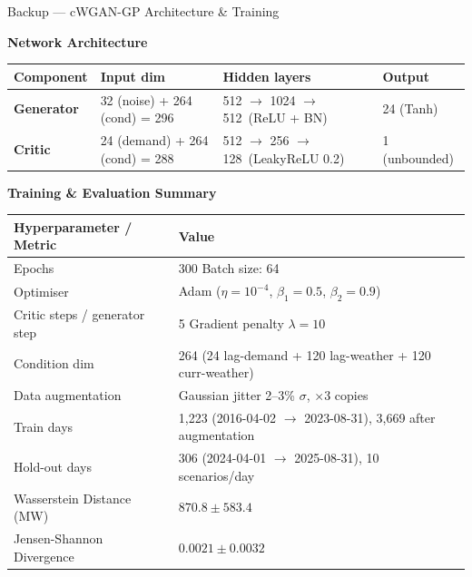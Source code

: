 \documentclass[aspectratio=169, 10pt]{beamer}
\begin{document}
\begin{frame}{Backup — cWGAN-GP Architecture \& Training}

\centering
\textbf{Network Architecture}

\vspace{0.4em}
\begin{tabular}{@{}llll@{}}
\toprule
Component & Input dim & Hidden layers & Output \\
\midrule
\textbf{Generator} & 32 (noise) + 264 (cond) = 296 & 512 $\to$ 1024 $\to$ 512\ (ReLU + BN) & 24 (Tanh) \\
\textbf{Critic}    & 24 (demand) + 264 (cond) = 288 & 512 $\to$ 256 $\to$ 128\ (LeakyReLU 0.2) & 1 (unbounded) \\
\bottomrule
\end{tabular}

\vspace{0.9em}
\textbf{Training \& Evaluation Summary}

\vspace{0.4em}
\begin{tabular}{@{}ll@{}}
\toprule
Hyperparameter / Metric & Value \\
\midrule
Epochs & 300 \quad Batch size: 64 \\
Optimiser & Adam ($\eta=10^{-4}$, $\beta_1=0.5$, $\beta_2=0.9$) \\
Critic steps / generator step & 5 \quad Gradient penalty $\lambda=10$ \\
Condition dim & 264 (24 lag-demand + 120 lag-weather + 120 curr-weather) \\
Data augmentation & Gaussian jitter 2–3\% $\sigma$, $\times 3$ copies \\
Train days & 1,223 (2016-04-02 $\to$ 2023-08-31), 3,669 after augmentation \\
Hold-out days & 306 (2024-04-01 $\to$ 2025-08-31), 10 scenarios/day \\
\midrule
Wasserstein Distance (MW) & $870.8 \pm 583.4$ \\
Jensen-Shannon Divergence & $0.0021 \pm 0.0032$ \\

\bottomrule
\end{tabular}

\end{frame}
\end{document}
